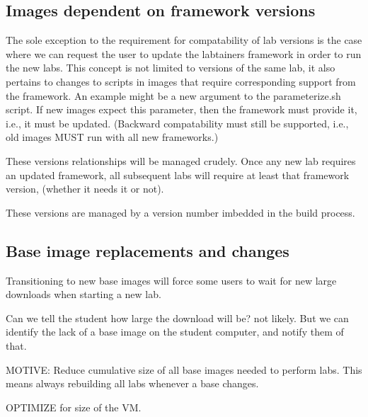 \subsection{Images dependent on framework versions}
The sole exception to the requirement for compatability of lab versions is the
case where we can request the user to update the labtainers framework in order
to run the new labs.  This concept is not limited to versions of the same lab,
it also pertains to changes to scripts in images that require corresponding
support from the framework.  An example might be a new argument to the
parameterize.sh script.  If new images expect this parameter, then the framework
must provide it, i.e., it must be updated.  (Backward compatability must still be
supported, i.e., old images MUST run with all new frameworks.)

These versions relationships will be managed crudely.  Once any new lab requires an
updated framework, all subsequent labs will require at least that framework version,
(whether it needs it or not).

These versions are managed by a version number imbedded in the build process.


\subsection{Base image replacements and changes}
Transitioning to new base images will force some users to wait for new large downloads
when starting a new lab.

Can we tell the student how large the download will be?  not likely.
But we can identify the lack of a base image on the student computer, and notify them
of that.

MOTIVE:  Reduce cumulative size of all base images needed to perform labs.
This means always rebuilding all labs whenever a base changes.

OPTIMIZE for size of the VM.

